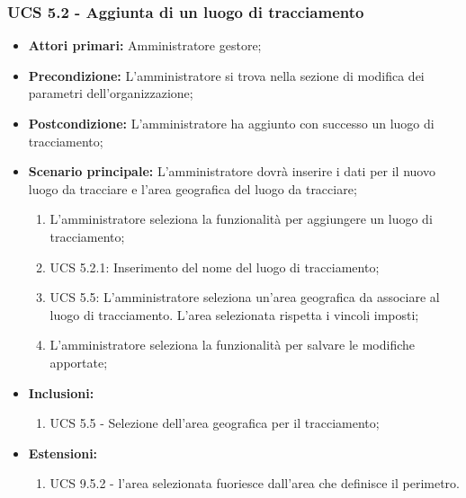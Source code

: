 \subsubsection{UCS 5.2 - Aggiunta di un luogo di tracciamento}%
\begin{itemize}
    \item \textbf{Attori primari:} Amministratore gestore;
    \item \textbf{Precondizione:} L'amministratore si trova nella sezione di modifica dei parametri dell'organizzazione;
    \item \textbf{Postcondizione:} L'amministratore ha aggiunto con successo un luogo di tracciamento;
    \item \textbf{Scenario principale:} L'amministratore dovrà inserire i dati per il nuovo luogo da tracciare e l'area geografica del luogo da tracciare;
    \begin{enumerate}%
        \item L'amministratore seleziona la funzionalità per aggiungere un luogo di tracciamento;
        \item UCS 5.2.1: Inserimento del nome del luogo di tracciamento;
        \item UCS 5.5: L'amministratore seleziona un'area geografica da associare al luogo di tracciamento. L'area selezionata rispetta i vincoli imposti;
        \item L'amministratore seleziona la funzionalità per salvare le modifiche apportate;
    \end{enumerate} 
    \item \textbf{Inclusioni:}
    \begin{enumerate}
        \item UCS 5.5 - Selezione dell'area geografica per il tracciamento;
    \end{enumerate}
    \item \textbf{Estensioni:}
    \begin{enumerate}
        \item UCS 9.5.2 - l'area selezionata fuoriesce dall'area che definisce il perimetro.
    \end{enumerate}
\end{itemize}

